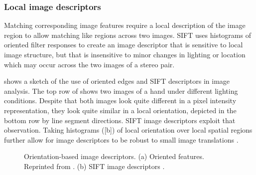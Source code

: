 \subsubsection{Local image descriptors}
Matching corresponding image features require a local description of the image region to allow matching like regions across two images.  SIFT  \cite{Lowe04} uses histograms of oriented filter responses to create an image descriptor that is sensitive to local image structure, but that is insensitive to minor changes in lighting or location which may occur across the two images of a stereo pair.

\Fig{\ref{fig:SIFT}} shows a sketch of the use of oriented edges and SIFT descriptors in image analysis. The top row of  shows two images of a hand under different lighting conditions. Despite that both images look quite different in a pixel intensity representation, they look quite similar in a local orientation, depicted in the bottom row by line segment directions.  SIFT image descriptors \cite{Lowe04} exploit that observation.  Taking histograms (\fig{\ref{fig:SIFT}}[b]) of local orientation over local spatial regions further allow for image descriptors to be robust to small image translations \cite{Freeman98c,Lowe04}.

\begin{figure}[h!]
    \centerline{
    }
    \caption{Orientation-based image descriptors.  (a) Oriented features. Reprinted from \cite{Freeman98c}.  (b) SIFT image descriptors \cite{Lowe04}.}
    \label{fig:SIFT}
\end{figure}

